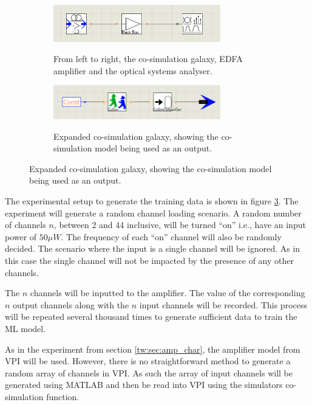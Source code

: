 \begin{figure}[h]
    \caption{Experimental setup in VPI. Figure \ref{fig:tw:top_lvl} shows the top level simulation. Figure \ref{fig:tw:co_sim_galaxy} shows the expanded co-simulation sub-module, referred to as a galaxy.}
    \begin{subfigure}{\textwidth}
        \centering
        \caption{From left to right, the co-simulation galaxy, EDFA amplifier and the optical systems analyser.}
        \includegraphics[width=0.8\textwidth]{images/technical_work/section_2_data generation/ex_setup.png}
        \label{fig:tw:top_lvl}
    \end{subfigure}
    \begin{subfigure}{\textwidth}
        \centering
        \caption{Expanded co-simulation galaxy, showing the co-simulation model being used as an output.}
        \includegraphics[width=0.8\textwidth]{images/technical_work/section_2_data generation/co_sim_galaxy.png} 
        \label{fig:tw:co_sim_galaxy}
    \end{subfigure}
    \label{fig:tw:exp_setup}
\end{figure}


The experimental setup to generate the training data is shown in figure \ref{fig:tw:exp_setup}. The experiment will generate a random channel loading scenario. A random number of channels $n$, between 2 and 44 inclusive, will be turned “on” i.e., have an input power of $50\mu W$. The frequency of each “on” channel will also be randomly decided. The scenario where the input is a single channel will be ignored. As in this case the single channel will not be impacted by the presence of any other channels.

The $n$ channels will be inputted to the amplifier. The value of the corresponding $n$ output channels along with the $n$ input channels will be recorded. This process will be repeated several thousand times to generate sufficient data to train the ML model. 

As in the experiment from section \ref{tw:sec:amp_char}, the amplifier model from VPI will be used. However, there is no straightforward method to generate a random array of channels in VPI. As such the array of input channels will be generated using MATLAB and then be read into VPI using the simulators co-simulation function.

